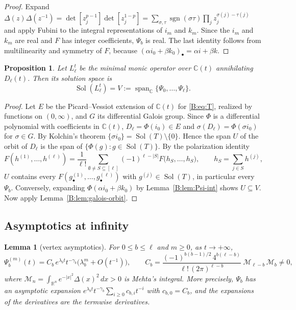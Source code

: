\documentclass[11pt,a4paper]{article}
\newtheorem{lemma}[theorem]{Lemma}
\newtheorem{proposition}[theorem]{Proposition}
\theoremstyle{definition}
\theoremstyle{remark}
\newcommand{\C}{\mathbb C}
\newcommand{\R}{\mathbb R}
\DeclareMathOperator{\Sol}{Sol}
\DeclareMathOperator{\sgn}{sgn}
\DeclareMathOperator{\spn}{span}
\numberwithin{equation}{section}
\begin{document}
\begin{proof}
Expand $\Delta(z)\Delta(z^{-1})=\det[z_j^{p-1}]\det[z_j^{1-p}]=\sum_{\sigma,\tau}\sgn(\sigma\tau)\prod_jz_j^{\sigma(j)-\tau(j)}$ and apply Fubini to the integral representations of $i_m$ and $k_m$. Since the $i_m$ and $k_m$ are real and $F$ has integer coefficients, $\Psi_b$ is real. The last identity follows from multilinearity and symmetry of $F$, because $(\alpha i_0+\beta k_0)_\bullet=\alpha i+\beta k$.
\end{proof}

\begin{proposition}\label{B:prop:solspace}
Let $L^t_\ell$ be the minimal monic operator over $\C(t)$ annihilating $D_\ell(t)$. Then its solution space is
\[
\Sol(L^t_\ell)=V:=\spn_\C\{\Psi_0,\dots,\Psi_\ell\}.
\]
\end{proposition}

\begin{proof}
Let $E$ be the Picard--Vessiot extension of $\C(t)$ for \eqref{B:eq:T}, realized by functions on $(0,\infty)$, and $G$ its differential Galois group. Since $\Phi$ is a differential polynomial with coefficients in $\C(t)$, $D_\ell=\Phi(i_0)\in E$ and $\sigma(D_\ell)=\Phi(\sigma i_0)$ for $\sigma\in G$. By Kolchin's theorem $\{\sigma i_0\}=\Sol(T)\setminus\{0\}$. Hence the span $U$ of the orbit of $D_\ell$ is the span of $\{\Phi(g):g\in\Sol(T)\}$. By the polarization identity
\[
F(h^{(1)},\dots,h^{(\ell)})=\frac1{\ell!}\sum_{\emptyset\ne S\subseteq[\ell]}(-1)^{\ell-|S|}F\bigl(h_S,\dots,h_S\bigr),\qquad h_S=\sum_{j\in S}h^{(j)},
\]
$U$ contains every $F(g^{(1)}_\bullet,\dots,g^{(\ell)}_\bullet)$ with $g^{(j)}\in\Sol(T)$, in particular every $\Psi_b$. Conversely, expanding $\Phi(\alpha i_0+\beta k_0)$ by Lemma~\ref{B:lem:Psi-int} shows $U\subseteq V$. Now apply Lemma~\ref{B:lem:galois-orbit}.
\end{proof}

\subsection{Asymptotics at infinity}

\begin{lemma}[vertex asymptotics]\label{B:lem:vertex}
For $0\le b\le\ell$ and $m\ge0$, as $t\to+\infty$,
\[
\Psi_b^{(m)}(t)=C_b\,e^{\lambda_bt}t^{-\gamma_b}\bigl(\lambda_b^m+O(t^{-1})\bigr),\qquad
C_b=\frac{(-1)^{b(b-1)/2}\,4^{b(\ell-b)}}{\ell!\,(2\pi)^{\ell-b}}\;\mathcal M_{\ell-b}\,\mathcal M_b\ne0,
\]
where $\mathcal M_n=\int_{\R^n}e^{-|x|^2}\Delta(x)^2\,dx>0$ is Mehta's integral. More precisely, $\Psi_b$ has an asymptotic expansion $e^{\lambda_bt}t^{-\gamma_b}\sum_{i\ge0}c_{b,i}t^{-i}$ with $c_{b,0}=C_b$, and the expansions of the derivatives are the termwise derivatives.
\end{lemma}
\end{document}
